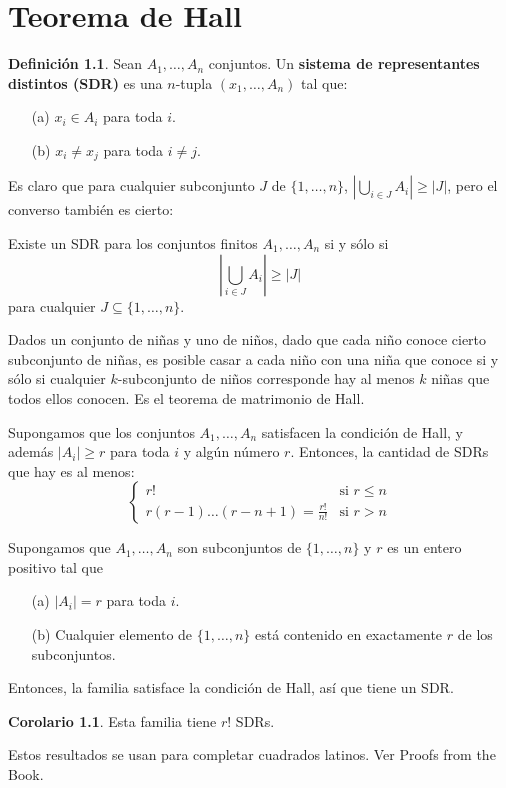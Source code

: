 \documentclass[spanish]{book}
\theoremstyle{definition}
\newtheorem*{defn}{Definición}
\newtheorem*{coro}{Corolario}
\begin{document}
\chapter{Teorema de Hall}\label{chap:hall}
\begin{defn}
	Sean $A_1,\ldots,A_n$ conjuntos. Un \textbf{sistema de representantes distintos (SDR)} es una $n$-tupla $(x_1,\ldots,A_n)$ tal que:
	\begin{itemize}
		\item[(a)] $x_i\in A_i$ para toda $i$.
		\item[(b)] $x_i\neq x_j$ para toda $i\neq j$.
	\end{itemize}
\end{defn}
Es claro que para cualquier subconjunto $J$ de $\{1,\ldots,n\}$, $\left|\bigcup_{i\in J}A_i\right|\geq|J|$, pero el converso también es cierto:
\begin{teo}[de Hall]
	Existe un SDR para los conjuntos finitos $A_1,\ldots,A_n$ si y sólo si 
	\[\left|\bigcup_{i\in J}A_i\right|\geq|J|\]
	para cualquier $J\subseteq\{1,\ldots,n\}$.
\end{teo}
Dados un conjunto de niñas y uno de niños, dado que cada niño conoce cierto subconjunto de niñas, es posible casar a cada niño con una niña que conoce si y sólo si cualquier $k$-subconjunto de niños corresponde hay al menos $k$ niñas que todos ellos conocen. Es el teorema de matrimonio de Hall.
\begin{teo}
	Supongamos que los conjuntos $A_1,\ldots,A_n$ satisfacen la condición de Hall, y además $|A_i|\geq r$ para toda $i$ y algún número $r$. Entonces, la cantidad de SDRs que hay es al menos:
	\[\begin{cases}
		r!\qquad&\text{si }r\leq n\\
		r(r-1)\ldots(r-n+1)=\frac{r!}{n!}&\text{si }r>n
	\end{cases}\]
\end{teo}
\begin{teo}
	Supongamos que $A_1,\ldots,A_n$ son subconjuntos de $\{1,\ldots,n\}$ y $r$ es un entero positivo tal que
	\begin{itemize}
		\item[(a)] $|A_i|=r$ para toda $i$.
		\item[(b)] Cualquier elemento de $\{1,\ldots,n\}$ está contenido en exactamente $r$ de los subconjuntos.
	\end{itemize}
	Entonces, la familia satisface la condición de Hall, así que tiene un SDR.
\end{teo}
\begin{coro}
	Esta familia tiene $r!$ SDRs.
\end{coro}
Estos resultados se usan para completar cuadrados latinos. Ver Proofs from the Book.
\end{document}

